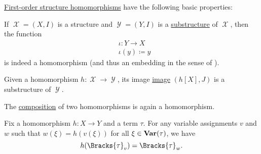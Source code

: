 \begin{proposition}\label{thm:def:first_order_homomorphism}
  \hyperref[def:first_order_homomorphism]{First-order structure homomorphisms} have the following basic properties:
  \begin{thmenum}
     If \( \mscrX = (X, I) \) is a structure and \( \mscrY = (Y, I) \) is a \hyperref[def:first_order_substructure]{substructure} of \( \mscrX \), then the  function
    \begin{equation}\label{thm:def:first_order_homomorphism/submodel/canonical_embedding}
      \begin{aligned}
        &\iota: Y \to X \\
        &\iota(y) \coloneqq y
      \end{aligned}
    \end{equation}
    is indeed a homomorphism (and thus an embedding in the sense of ).

     Given a homomorphism \( h: \mscrX \to \mscrY \), its image \hyperref[def:multi_valued_function/image]{image} \( (h[X], J) \) is a substructure of \( \mscrY \).

     The \hyperref[def:multi_valued_function/composition]{composition} of two homomorphisms is again a homomorphism.

     Fix a homomorphism \( h: X \to Y \) and a term \( \tau \). For any variable assignments \( v \) and \( w \) such that \( w(\xi) = h(v(\xi)) \) for all \( \xi \in \operatorname{\mathbf{Var}}(\tau) \), we have
    \begin{equation*}
      h(\Bracks{\tau}_v) = \Bracks{\tau}_w.
    \end{equation*}
  \end{thmenum}
\end{proposition}
